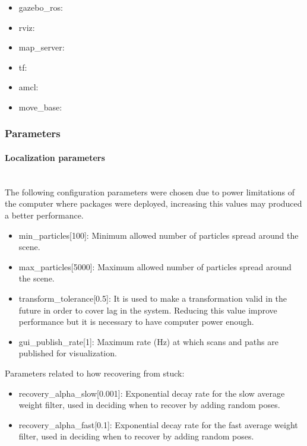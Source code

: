 \documentclass[10pt,journal,compsoc]{IEEEtran}
\begin{document}
\begin{itemize}
\item gazebo\_ros:
\item rviz:
\item map\_server:
\item tf:
\item amcl:
\item move\_base: 
\end{itemize}

\subsubsection{Parameters}

\paragraph{Localization parameters}\mbox{} \\

The following configuration parameters were chosen due to power limitations of the computer where packages were deployed, increasing this values may produced a better performance.

\begin{itemize}
\item min\_particles[100]: Minimum allowed number of particles spread around the scene.
\item max\_particles[5000]: Maximum allowed number of particles spread around the scene. 
\item transform\_tolerance[0.5]: It is used to make a transformation valid in the future in order to cover lag in the system. Reducing this value improve performance but it is necessary to have computer power enough.
\item gui\_publish\_rate[1]: Maximum rate (Hz) at which scans and paths are published for visualization.
\end{itemize}

Parameters related to how recovering from stuck:

\begin{itemize}
\item recovery\_alpha\_slow[0.001]: Exponential decay rate for the slow average weight filter, used in deciding when to recover by adding random poses.   
\item recovery\_alpha\_fast[0.1]: Exponential decay rate for the fast average weight filter, 
used in deciding when to recover by adding random poses.
\end{itemize}
\end{document}
